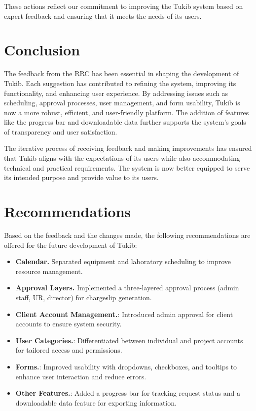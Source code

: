 These actions reflect our commitment to improving the Tukib system based on expert feedback and ensuring that it meets the needs of its users.

\section{Conclusion}
The feedback from the RRC has been essential in shaping the development of Tukib. Each suggestion has contributed to refining the system, improving its functionality, and enhancing user experience. By addressing issues such as scheduling, approval processes, user management, and form usability, Tukib is now a more robust, efficient, and user-friendly platform. The addition of features like the progress bar and downloadable data further supports the system’s goals of transparency and user satisfaction.

The iterative process of receiving feedback and making improvements has ensured that Tukib aligns with the expectations of its users while also accommodating technical and practical requirements. The system is now better equipped to serve its intended purpose and provide value to its users.

\section{Recommendations}
Based on the feedback and the changes made, the following recommendations are offered for the future development of Tukib:

\begin{itemize}
	\item \textbf{Calendar.} Separated equipment and laboratory scheduling to improve resource management.
	\item \textbf{Approval Layers.} Implemented a three-layered approval process (admin staff, UR, director) for chargeslip generation.
	\item \textbf{Client Account Management.}: Introduced admin approval for client accounts to ensure system security.
	\item \textbf{User Categories.}: Differentiated between individual and project accounts for tailored access and permissions.
	\item \textbf{Forms.}: Improved usability with dropdowns, checkboxes, and tooltips to enhance user interaction and reduce errors.
	\item \textbf{Other Features.}: Added a progress bar for tracking request status and a downloadable data feature for exporting information.
\end{itemize}

